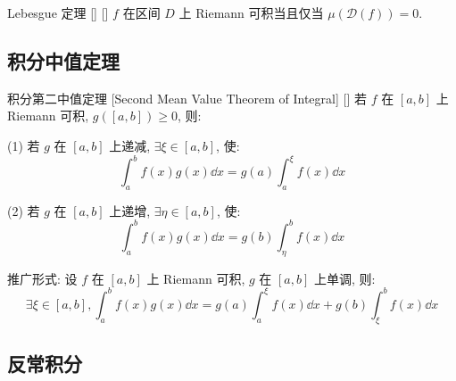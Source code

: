 \documentclass[UTF8]{ctexart}
\begin{document}
            \begin{thm}
			    []
			    {Lebesgue 定理}
			    []
			    []
                \(f\) 在区间 \(D\) 上 Riemann 可积当且仅当 \(\mu(\mathcal{D}(f))=0\). 
            \end{thm}

        \subsection{积分中值定理}
			
			\begin{thm}
			    []
			    {积分第二中值定理 }
			    [Second Mean Value Theorem of Integral]
			    []
				若 \(f\) 在 \([a,b]\) 上 Riemann 可积, \(g([a,b])\geq 0\), 则: 
				
				(1) 若 \(g\) 在 \([a,b]\) 上递减, \(\exists\xi\in[a,b]\), 使: 
				\[\int_a^b f(x)g(x)\dd x=g(a)\int_a^\xi f(x)\dd x\]

				(2) 若 \(g\) 在 \([a,b]\) 上递增, \(\exists\eta\in[a,b]\), 使: 
				\[\int_a^b f(x)g(x)\dd x=g(b)\int_\eta^b f(x)\dd x\]

			    {}
			    {推广形式: }
			    {}
			    {}
				设 \(f\) 在 \([a,b]\) 上 Riemann 可积, \(g\) 在 \([a,b]\) 上单调, 则: 
				\[\exists\xi\in[a,b], \int_a^b f(x)g(x)\dd x=g(a)\int_a^\xi f(x)\dd x+g(b)\int_\xi^b f(x)\dd x\]
			\end{thm}

        \subsection{反常积分}
            
\end{document}
